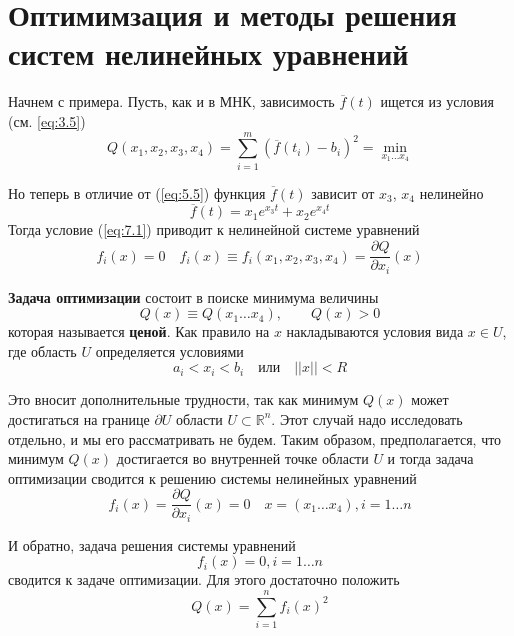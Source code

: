 \section{Оптимимзация и методы решения систем нелинейных уравнений}

Начнем с примера. Пусть, как и в МНК, зависимость $\overline{f}(t)$ ищется из условия (см. \ref{eq:3.5})
\begin{equation} \label{eq:representation}
	Q(x_1, x_2, x_3, x_4) = \sum^m_{i=1}{(\overline{f}(t_i)-b_i)^2} = \min_{x_1 \dots x_4}
\end{equation}

Но теперь в отличие от (\ref{eq:5.5}) функция $\overline{f}(t)$ зависит от $x_3$, $x_4$ нелинейно
\begin{equation} \label{eq:representation}
	\overline{f}(t) = x_1e^{x_3 t} + x_2e^{x_4 t}
\end{equation}
Тогда условие (\ref{eq:7.1}) приводит к нелинейной системе уравнений
\begin{equation} \label{eq:representation}
	f_i(x) = 0 \quad
	f_i(x) \equiv f_i(x_1, x_2, x_3, x_4) = \frac{\partial Q}{\partial x_i}(x)
\end{equation}

\textbf{Задача оптимизации} состоит в поиске минимума величины 
\begin{equation} \label{eq:representation}
	Q(x) \equiv Q(x_1 \dots x_4), \qquad
	Q(x) > 0
\end{equation}
которая называется \textbf{ценой}. Как правило на $x$ накладываются условия вида $x \in U$, где область $U$ определяется условиями
\begin{equation} \label{eq:representation}
	a_i < x_i < b_i \quad \textrm{или} \quad ||x|| < R
\end{equation}

Это вносит дополнительные трудности, так как минимум $Q(x)$ может достигаться на границе $\partial U$  области $U \subset \mathbb{R}^n$. Этот случай надо исследовать отдельно, и мы его рассматривать не будем. Таким образом, предполагается, что минимум $Q(x)$ достигается во внутренней точке области $U$ и тогда задача оптимизации сводится к решению системы нелинейных уравнений
\begin{equation} \label{eq:representation}
	f_i(x) = \frac{\partial Q}{\partial x_i}(x) = 0 \quad x = (x_1 \dots x_4), i = 1 \dots n
\end{equation}

И обратно, задача решения системы уравнений
\begin{equation} \label{eq:representation}
	f_i(x) = 0, i = 1 \dots n
\end{equation}
сводится к задаче оптимизации. Для этого достаточно положить
\begin{equation} \label{eq:representation}
	Q(x) = \sum^n_{i=1}{f_i(x)^2}
\end{equation}

